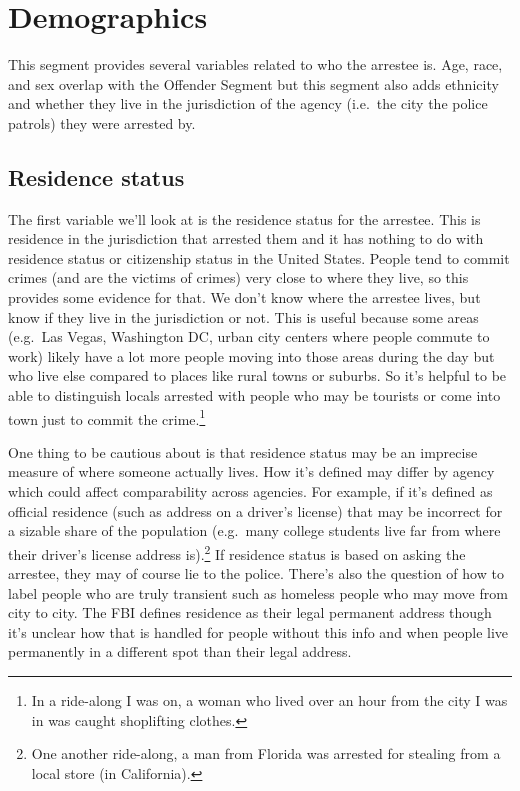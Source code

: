 \documentclass[
]{krantz}
\begin{document}
\section{Demographics}\label{demographics-3}

This segment provides several variables related to who the
arrestee is. Age, race, and sex overlap with the Offender
Segment but this segment also adds ethnicity and whether
they live in the jurisdiction of the agency (i.e.~the city
the police patrols) they were arrested by.

\subsection{Residence status}\label{residence-status-1}

The first variable we'll look at is the residence status for
the arrestee. This is residence in the jurisdiction that
arrested them and it has nothing to do with residence status
or citizenship status in the United States. People tend to
commit crimes (and are the victims of crimes) very close to
where they live, so this provides some evidence for that. We
don't know where the arrestee lives, but know if they live
in the jurisdiction or not. This is useful because some
areas (e.g.~Las Vegas, Washington DC, urban city centers
where people commute to work) likely have a lot more people
moving into those areas during the day but who live else
compared to places like rural towns or suburbs. So it's
helpful to be able to distinguish locals arrested with
people who may be tourists or come into town just to commit
the crime.\footnote{In a ride-along I was on, a woman who
  lived over an hour from the city I was in was caught
  shoplifting clothes.}

One thing to be cautious about is that residence status may
be an imprecise measure of where someone actually lives. How
it's defined may differ by agency which could affect
comparability across agencies. For example, if it's defined
as official residence (such as address on a driver's
license) that may be incorrect for a sizable share of the
population (e.g.~many college students live far from where
their driver's license address is).\footnote{One another
  ride-along, a man from Florida was arrested for stealing
  from a local store (in California).} If residence status
is based on asking the arrestee, they may of course lie to
the police. There's also the question of how to label people
who are truly transient such as homeless people who may move
from city to city. The FBI defines residence as their legal
permanent address though it's unclear how that is handled
for people without this info and when people live
permanently in a different spot than their legal address.
\end{document}
